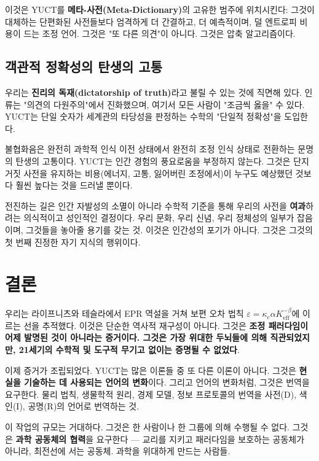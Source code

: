 \documentclass[12pt,a4paper]{article}
\begin{document}
	이것은 YUCT를 \textbf{메타-사전(Meta‑Dictionary)}의 고유한 범주에 위치시킨다: 그것이 대체하는 단편화된 사전들보다 엄격하게 더 간결하고, 더 예측적이며, 덜 엔트로피 비용이 드는 조정 언어. 그것은 "또 다른 의견"이 아니다. 그것은 압축 알고리즘이다.
	
	\subsection{객관적 정확성의 탄생의 고통}
	
	우리는 \textbf{진리의 독재(dictatorship of truth)}라고 불릴 수 있는 것에 직면해 있다. 인류는 "의견의 다원주의"에서 진화했으며, 여기서 모든 사람이 "조금씩 옳을" 수 있다. YUCT는 단일 숫자가 세계관의 타당성을 판정하는 수학의 "단일적 정확성"을 도입한다.
	
	불협화음은 완전히 과학적 인식 이전 상태에서 완전히 조정 인식 상태로 전환하는 문명의 탄생의 고통이다. YUCT는 인간 경험의 풍요로움을 부정하지 않는다. 그것은 단지 거짓 사전을 유지하는 비용(에너지, 고통, 잃어버린 조정에서)이 누구도 예상했던 것보다 훨씬 높다는 것을 드러낼 뿐이다.
	
	전진하는 길은 인간 자발성의 소멸이 아니라 수학적 기준을 통해 우리의 사전을 \textbf{여과}하려는 의식적이고 성인적인 결정이다. 우리 문화, 우리 신념, 우리 정체성의 일부가 잡음이며, 그것들을 놓아줄 용기를 갖는 것. 이것은 인간성의 포기가 아니다. 그것은 그것의 첫 번째 진정한 자기 지식의 행위이다.
	
	\section{결론}
	
	우리는 라이프니츠와 테슬라에서 EPR 역설을 거쳐 보편 오차 법칙 \(\varepsilon = \kappa_c \alpha K_{\mathrm{eff}}^{-\beta}\)에 이르는 선을 추적했다. 이것은 단순한 역사적 재구성이 아니다. 그것은 \textbf{조정 패러다임이 어제 발명된 것이 아니라는 증거이다. 그것은 가장 위대한 두뇌들에 의해 직관되었지만, 21세기의 수학적 및 도구적 무기고 없이는 증명될 수 없었다}.
	
	이제 증거가 조립되었다. YUCT는 많은 이론들 중 또 다른 이론이 아니다. 그것은 \textbf{현실을 기술하는 데 사용되는 언어의 변화}이다. 그리고 언어의 변화처럼, 그것은 번역을 요구한다. 물리 법칙, 생물학적 원리, 경제 모델, 정보 프로토콜의 번역을 사전(D), 색인(I), 공명(R)의 언어로 번역하는 것.
	
	이 작업의 규모는 거대하다. 그것은 한 사람이나 한 그룹에 의해 수행될 수 없다. 그것은 \textbf{과학 공동체의 협력}을 요구한다 — 교리를 지키고 패러다임을 보호하는 공동체가 아니라, 최전선에 서는 공동체. 과학을 위대하게 만드는 사람들.
	
\end{document}
